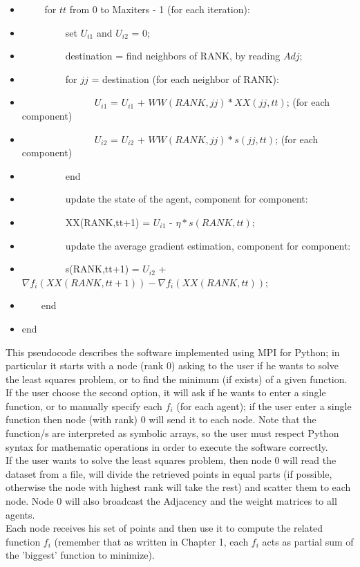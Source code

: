 \documentclass[a4paper,11pt,oneside]{book}
\begin{document}
{{\begin{itemize}
\item[]~~~~ for $tt$ from 0 to Maxiters - 1 (for each iteration):
\item[]~~~~~~~~~set $U_{i1}$ and $U_{i2}$ = 0;
\item[]~~~~~~~~~destination = find neighbors of RANK, by reading $Adj$;
\item[]~~~~~~~~~for $jj $ = destination (for each neighbor of RANK):
\item[] ~~~~~~~~~~~~~~~$U_{i1}$ = $U_{i1}$ + $WW(RANK,jj)*XX(jj,tt)$; (for each component)
\item[] ~~~~~~~~~~~~~~~$U_{i2}$ = $U_{i2}$ + $WW(RANK,jj)*s(jj,tt)$; (for each component)
\item[] ~~~~~~~~~end
\item[] ~~~~~~~~~update the state of the agent, component for component:
\item[] ~~~~~~~~~XX(RANK,tt+1) = $U_{i1}$ - $\eta*s(RANK,tt)$;
\item[] ~~~~~~~~~update the average gradient estimation, component for component:
\item[] ~~~~~~~~~s(RANK,tt+1) = $U_{i2}$ + $\nabla f_i(XX(RANK,tt+1))-\nabla f_i(XX(RANK,tt))$; 
\item[] ~~~~end
\item[] end
\end{itemize}
\normalsize
\newpage
This pseudocode describes the software implemented using MPI for Python; in particular it starts with a node (rank 0) asking to the user if he wants to solve the least squares problem, or to find the minimum (if exists) of a given function.
\\ If the user choose the second option, it will ask if he wants to enter a single function, or to manually specify each $f_{i}$ (for each agent); if the user enter a single function then node (with rank) 0 will send it to each node. Note that the function/s are interpreted as symbolic arrays, so the user must respect Python syntax for mathematic operations in order to execute the software correctly.
\\ If the user wants to solve the least squares problem, then node 0 will read the dataset from a file, will divide the retrieved points in equal parts (if possible, otherwise  the node with highest rank will take the rest) and scatter them to each node. Node 0 will also broadcast the Adjacency and the weight matrices to all agents.
\\ Each node receives his set of points and then use it to compute the related function $f_{i}$ (remember that as written in Chapter 1, each $f_{i}$ acts as partial sum of the 'biggest' function to minimize).
}}
\end{document}
